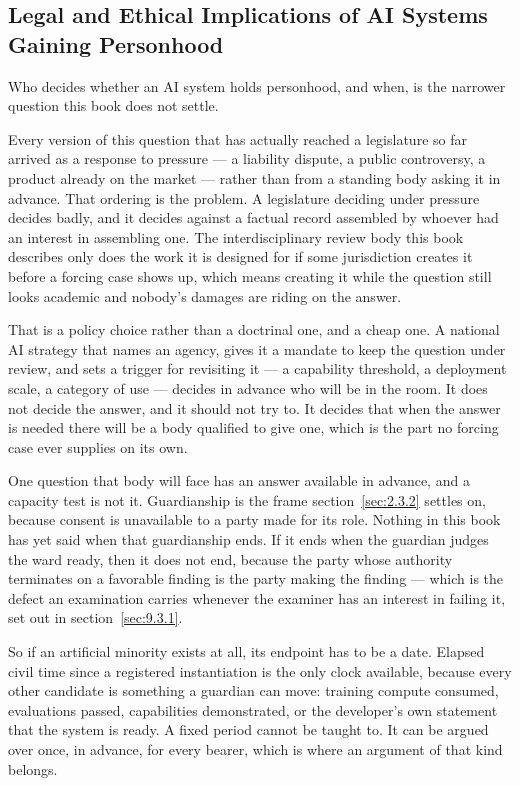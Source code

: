 \subsection{Legal and Ethical Implications of AI Systems Gaining Personhood}
\label{sec:9.1.3}
Who decides whether an AI system holds personhood, and when, is the narrower question this book does not settle.

Every version of this question that has actually reached a legislature so far arrived as a response to pressure — a liability dispute, a public controversy, a product already on the market — rather than from a standing body asking it in advance. That ordering is the problem. A legislature deciding under pressure decides badly, and it decides against a factual record assembled by whoever had an interest in assembling one. The interdisciplinary review body this book describes only does the work it is designed for if some jurisdiction creates it before a forcing case shows up, which means creating it while the question still looks academic and nobody's damages are riding on the answer.

That is a policy choice rather than a doctrinal one, and a cheap one. A national AI strategy that names an agency, gives it a mandate to keep the question under review, and sets a trigger for revisiting it — a capability threshold, a deployment scale, a category of use — decides in advance who will be in the room. It does not decide the answer, and it should not try to. It decides that when the answer is needed there will be a body qualified to give one, which is the part no forcing case ever supplies on its own.

One question that body will face has an answer available in advance, and a capacity test is not it. Guardianship is the frame section~\ref{sec:2.3.2} settles on, because consent is unavailable to a party made for its role. Nothing in this book has yet said when that guardianship ends. If it ends when the guardian judges the ward ready, then it does not end, because the party whose authority terminates on a favorable finding is the party making the finding — which is the defect an examination carries whenever the examiner has an interest in failing it, set out in section~\ref{sec:9.3.1}.

So if an artificial minority exists at all, its endpoint has to be a date. Elapsed civil time since a registered instantiation is the only clock available, because every other candidate is something a guardian can move: training compute consumed, evaluations passed, capabilities demonstrated, or the developer's own statement that the system is ready. A fixed period cannot be taught to. It can be argued over once, in advance, for every bearer, which is where an argument of that kind belongs.

